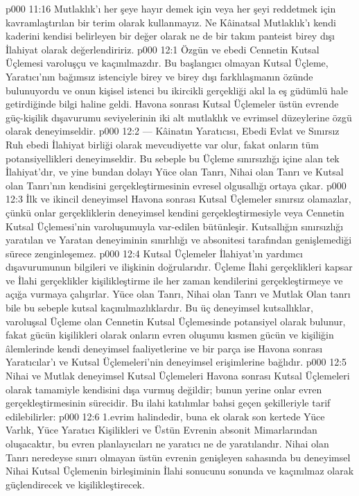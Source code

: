 \vs p000 11:16 Mutlaklık’ı her şeye hayır demek için veya her şeyi reddetmek için kavramlaştırılan bir terim olarak kullanmayız. Ne Kâinatsal Mutlaklık’ı kendi kaderini kendisi belirleyen bir değer olarak ne de bir takım panteist birey dışı İlahiyat olarak değerlendiririz.
\vs p000 12:1 Özgün ve ebedi Cennetin Kutsal Üçlemesi varoluşçu ve kaçınılmazdır. Bu başlangıcı olmayan Kutsal Üçleme, Yaratıcı’nın bağımsız istenciyle birey ve birey dışı farklılaşmanın özünde bulunuyordu ve onun kişisel istenci bu ikircikli gerçekliği akıl la eş güdümlü hale getirdiğinde bilgi haline geldi. Havona sonrası Kutsal Üçlemeler üstün evrende güç\hyp{}kişilik dışavurumu seviyelerinin iki alt mutlaklık ve evrimsel düzeylerine özgü olarak deneyimseldir.
\vs p000 12:2  --- Kâinatın Yaratıcısı, Ebedi Evlat ve Sınırsız Ruh ebedi İlahiyat birliği olarak mevcudiyette var olur, fakat onların tüm potansiyellikleri deneyimseldir. Bu sebeple bu Üçleme sınırsızlığı içine alan tek İlahiyat’dır, ve yine bundan dolayı Yüce olan Tanrı, Nihai olan Tanrı ve Kutsal olan Tanrı’nın kendisini gerçekleştirmesinin evresel olgusallığı ortaya çıkar.
\vs p000 12:3 İlk ve ikincil deneyimsel Havona sonrası Kutsal Üçlemeler sınırsız olamazlar, çünkü onlar gerçekliklerin deneyimsel kendini gerçekleştirmesiyle veya Cennetin Kutsal Üçlemesi’nin varoluşumuyla var\hyp{}edilen  bütünleşir. Kutsallığın sınırsızlığı yaratılan ve Yaratan deneyiminin sınırlılığı ve absonitesi tarafından genişlemediği sürece zenginleşemez.
\vs p000 12:4 Kutsal Üçlemeler İlahiyat’ın yardımcı dışavurumunun bilgileri ve ilişkinin doğrularıdır. Üçleme İlahi gerçeklikleri kapsar ve İlahi gerçeklikler kişilikleştirme ile her zaman kendilerini gerçekleştirmeye ve açığa vurmaya çalışırlar. Yüce olan Tanrı, Nihai olan Tanrı ve Mutlak Olan tanrı bile bu sebeple kutsal kaçınılmazlıklardır. Bu üç deneyimsel kutsallıklar, varoluşsal Üçleme olan Cennetin Kutsal Üçlemesinde potansiyel olarak bulunur, fakat gücün kişilikleri olarak onların evren oluşumu kısmen gücün ve kişiliğin âlemlerinde kendi deneyimsel faaliyetlerine ve bir parça ise Havona sonrası Yaratıcılar’ı ve Kutsal Üçlemeleri’nin deneyimsel erişimlerine bağlıdır.
\vs p000 12:5 Nihai ve Mutlak deneyimsel Kutsal Üçlemeleri Havona sonrası Kutsal Üçlemeleri olarak tamamiyle kendisini dışa vurmuş değildir; bunun yerine onlar evren gerçekleştirmesinin sürecidir. Bu ilahi katılımlar bahsi geçen şekilleriyle tarif edilebilirler:
\vs p000 12:6 1.\bibnobreakspace {}evrim halindedir, buna ek olarak son kertede Yüce Varlık, Yüce Yaratıcı Kişilikleri ve Üstün Evrenin absonit Mimarlarından oluşacaktır, bu evren planlayıcıları ne yaratıcı ne de yaratılandır. Nihai olan Tanrı neredeyse sınırı olmayan üstün evrenin genişleyen sahasında bu deneyimsel Nihai Kutsal Üçlemenin birleşiminin İlahi sonucunu sonunda ve kaçınılmaz olarak güçlendirecek ve kişilikleştirecek.
